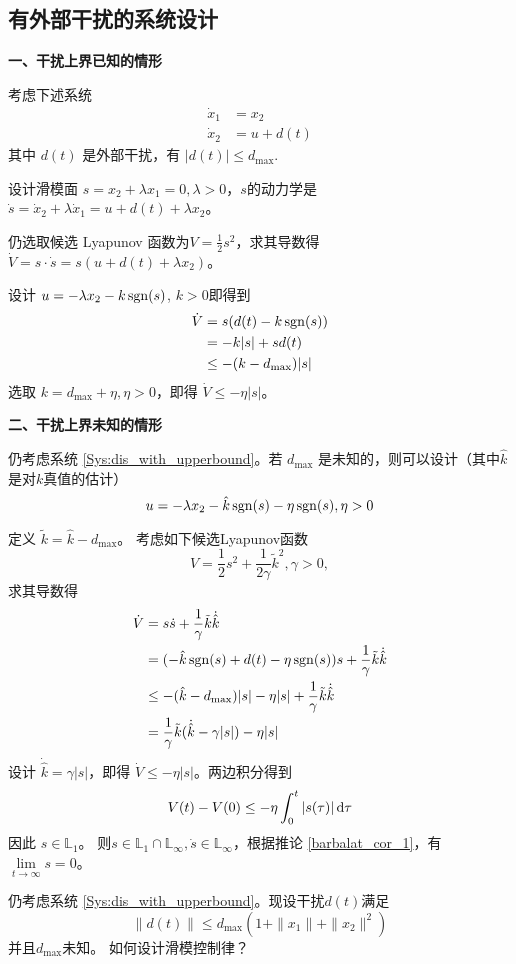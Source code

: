 \subsection{有外部干扰的系统设计}\label{5C_disturbance}
\noindent\textbf{一、干扰上界已知的情形}

考虑下述系统
 \begin{equation}
      \begin{aligned}
    \dot{x}_1 & = x_2\\
    \dot{x}_2 & = u + d (t)
  \end{aligned}\label{Sys:dis_with_upperbound}
 \end{equation}
  其中 $d (t)$ 是外部干扰，有 $| d (t) | \leq d_{\max}$.
  
  设计滑模面 $s = x_2 + \lambda x_1=0, \lambda > 0$，$s$的动力学是 $\dot{s} = \dot{x}_2 + \lambda \dot{x}_1 = u + d (t)
  + \lambda x_2$。
  
  仍选取候选 Lyapunov 函数为$V = \frac{1}{2} s^2$，求其导数得 $\dot{V} = s \cdot \dot{s} = s (u + d (t) + \lambda x_2)$。
  
  设计 $u = - \lambda x_2 - k  \operatorname{sgn} (s)$, $k >
  0$即得到
  \begin{align*}
    \dot{V} & = s (d (t) - k  \operatorname{sgn} (s))\\
    & = - k  | s | + s  d (t)\\
    & \leq - (k - d_{\max})  | s |
  \end{align*}
  选取 $k = d_{\max} + \eta, \eta > 0$，即得 $\dot{V} \leq - \eta | s |$。

\noindent\textbf{二、干扰上界未知的情形}

  仍考虑系统 \eqref{Sys:dis_with_upperbound}。若 $d_{\max}$ 是未知的，则可以设计（其中$\hat{k}$是对$k$真值的估计）
  \[ u = - \lambda x_2 - \hat{k} \operatorname{sgn} (s)- \eta\operatorname{sgn} (s),\eta>0 \]
  
  定义 $\tilde{k} = \hat{k} - d_{\max} $。
  考虑如下候选Lyapunov函数
  \[ V = \frac{1}{2} s^2 + \frac{1}{2 \gamma} \tilde{k}^2, \gamma > 0, \]
  求其导数得
  \begin{align*}
    \dot{V} & = s  \dot{s} + \frac{1}{\gamma} \tilde{k} \dot{\hat{k}}\\
    & = (-\hat{k}\operatorname{sgn} (s) + d(t)- \eta \operatorname{sgn} (s)) s + \frac{1}{\gamma} \tilde{k}  \dot{\hat{k}}\\
    & \leq - (\hat{k} - d_{\max}) | s | - \eta | s | + \frac{1}{\gamma} \tilde{k}  \dot{\hat{k}}\\
    & = \frac{1}{\gamma} \tilde{k} (\dot{\hat{k}} - \gamma | s |) - \eta | s |
  \end{align*}
  设计 $\dot{\hat{k}} = \gamma | s |$，即得 $\dot{V} \leq - \eta | s |$。两边积分得到
  \[ V (t) - V (0) \leq - \eta \int^t_0 | s(\tau) | \mathop{}\!\mathrm{d} \tau \]
  因此 $s \in \mathbb{L}_1$。
  则$s \in \mathbb{L}_1 \cap \mathbb{L}_{\infty}, \dot{s} \in
  \mathbb{L}_{\infty}$，根据推论 \ref{barbalat_cor_1}，有 $\lim\limits_{t \rightarrow \infty} s = 0$。
\begin{problem}\label{Pro:dis_with_unknown_upperbound}
    仍考虑系统 \eqref{Sys:dis_with_upperbound}。现设干扰$d(t)$满足
  \[ \| d (t) \| \leq d_{\max} (1 + \| x_1 \| + \| x_2 \|^2) \]
并且$d_{\max}$未知。
如何设计滑模控制律？
\end{problem}

